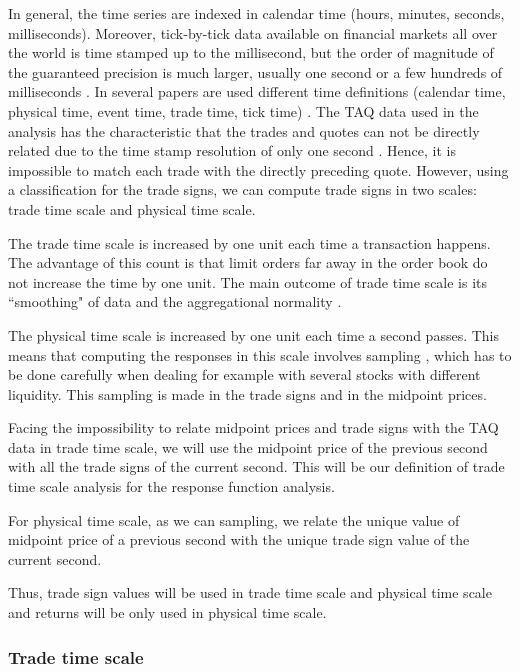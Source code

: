 In general, the time series are indexed in calendar time (hours, minutes,
seconds, milliseconds). Moreover, tick-by-tick data available on financial
markets all over the world is time stamped up to the millisecond, but the order
of magnitude of the guaranteed precision is much larger, usually one second or
a few hundreds of milliseconds \cite{empirical_facts}. In several papers are
used different time definitions (calendar time, physical time, event time,
trade time, tick time) \cite{empirical_facts,sampling_returns,market_making}.
The TAQ data used in the analysis has the characteristic that the trades and
quotes can not be directly related due to the time stamp resolution of only one
second \cite{Wang_2016_cross}. Hence, it is impossible to match each trade with
the directly preceding quote. However, using a classification for the trade
signs, we can compute trade signs in two scales: trade time scale and physical
time scale.

The trade time scale is increased by one unit each time a transaction happens.
The advantage of this count is that limit orders far away in the order book do
not increase the time by one unit. The main outcome of trade time scale is its
``smoothing" of data and the aggregational normality \cite{empirical_facts}.

The physical time scale is increased by one unit each time a second passes.
This means that computing the responses in this scale involves sampling
\cite{Wang_2016_cross,sampling_returns}, which has to be done carefully when
dealing for example with several stocks with different liquidity. This sampling
is made in the trade signs and in the midpoint prices.

Facing the impossibility to relate midpoint prices and trade signs with the TAQ
data in trade time scale, we will use the midpoint price of the previous second
with all the trade signs of the current second. This will be our definition of
trade time scale analysis for the response function analysis.

For physical time scale, as we can sampling, we relate the unique value of
midpoint price of a previous second with the unique trade sign value of the
current second.

Thus, trade sign values will be used in trade time scale and physical time
scale and returns will be only used in physical time scale.

\subsubsection{Trade time scale}\label{subsubsec:trade_time}

